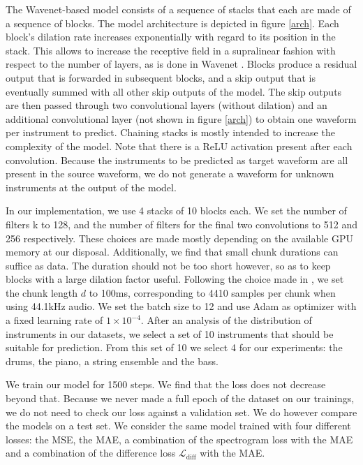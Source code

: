 \documentclass[twocolumn,superscriptaddress,aps]{revtex4-1}
\begin{document}
The Wavenet-based model consists of a sequence of stacks that each are made of a sequence of blocks. The model architecture is depicted in figure \ref{arch}. Each block's dilation rate increases exponentially with regard to its position in the stack. This allows to increase the receptive field in a supralinear fashion with respect to the number of layers, as is done in Wavenet \cite{WaveNet}. Blocks produce a residual output that is forwarded in subsequent blocks, and a skip output that is eventually summed with all other skip outputs of the model. The skip outputs are then passed through two convolutional layers (without dilation) and an additional convolutional layer (not shown in figure \ref{arch}) to obtain one waveform per instrument to predict. Chaining stacks is mostly intended to increase the complexity of the model. Note that there is a ReLU activation present after each convolution. Because the instruments to be predicted as target waveform are all present in the source waveform, we do not generate a waveform for unknown instruments at the output of the model.

In our implementation, we use 4 stacks of 10 blocks each. We set the number of filters k to 128, and the number of filters for the final two convolutions to 512 and 256 respectively. These choices are made mostly depending on the available GPU memory at our disposal. Additionally, we find that small chunk durations can suffice as data. The duration should not be too short however, so as to keep blocks with a large dilation factor useful. Following the choice made in \cite{SourceSeparationWaveformDomain}, we set the chunk length $d$ to 100ms, corresponding to 4410 samples per chunk when using 44.1kHz audio. We set the batch size to 12 and use Adam as optimizer with a fixed learning rate of $1\times10^{-4}$. After an analysis of the distribution of instruments in our datasets, we select a set of 10 instruments that should be suitable for prediction. From this set of 10 we select 4 for our experiments: the drums, the piano, a string ensemble and the bass.

We train our model for 1500 steps. We find that the loss does not decrease beyond that. Because we never made a full epoch of the dataset on our trainings, we do not need to check our loss against a validation set. We do however compare the models on a test set. We consider the same model trained with four different losses: the MSE, the MAE, a combination of the spectrogram loss with the MAE and a combination of the difference loss $\mathcal{L}_{\text{diff}}$ with the MAE.
\end{document}
